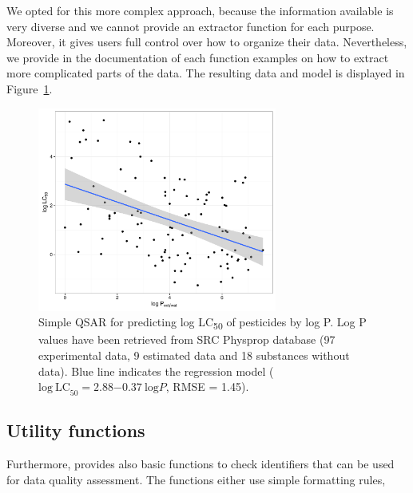 \documentclass[article, shortnames]{jss}\usepackage[]{graphicx}\usepackage[]{color}
\begin{document}
\begin{CodeChunk}
\end{CodeChunk}

We opted for this more complex approach, because the information available is very diverse and we cannot provide an extractor function for each purpose.
Moreover, it gives users full control over how to organize their data. 
Nevertheless, we provide in the documentation of each function examples on how to extract more complicated parts of the data.
The resulting data and model is displayed in Figure~\ref{fig:fig3}.

\begin{figure}[ht]
\begin{CodeChunk}


{\centering \includegraphics[width=0.7\textwidth]{plot_qsar-1} 

}

\end{CodeChunk}
\caption{Simple QSAR for predicting log LC\textsubscript{50} of pesticides by log P. 
Log P values have been retrieved from SRC Physprop database (97 experimental data, 9 estimated data and 18 substances without data). 
Blue line indicates the regression model ($\mathrm{log~LC}_{50} = 2.88\ensuremath{-0.37}~\mathrm{log} P$, RMSE = 1.45).}
\label{fig:fig3}
\end{figure}


\subsection[Utility functions]{Utility functions}
Furthermore,  provides also basic functions to check identifiers that can be used for data quality assessment.
The functions either use simple formatting rules,
\end{document}
